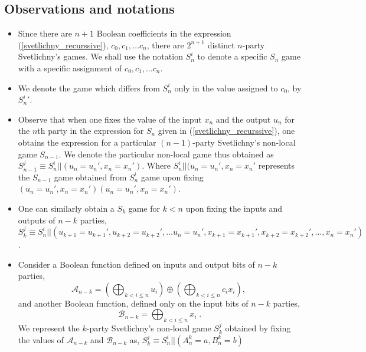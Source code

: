 \documentclass[%
 reprint,
 amsmath,amssymb,
 aps,
]{revtex4-1}
\theoremstyle{plain}
\begin{document}
\subsection{Observations and notations}
\begin{itemize}
\item Since there are ${n+1}$ Boolean coefficients in the expression (\ref{svetlichny_recurssive}), $c_0,c_1,\ldots c_n$, there are $2^{n+1}$ distinct $n$-party Svetlichny's games. We shall use the notation $S_n^i$ to denote a specific $S_n$ game with a specific assignment of $c_0,c_1,\ldots c_n$.
\item We denote the game which differs from $S_n^i$ only in the value assigned to $c_0$, by ${S_n^i}'$.
\item Observe that when one fixes the value of the input $x_n$ and the output $u_n$ for the $n$th party in the expression for $S_n$ given in (\ref{svetlichny_recurssive}), one obtains the expression for a particular $(n-1)$-party Svetlichny's non-local game $S_{n-1}$. We denote the particular non-local game thus obtained as $S_{n-1}^j\equiv S_n^i||(u_n=u_n',x_n=x_n')$. Where $S_n^i||(u_n=u_n',x_n=x_n'$ represents the $S_{n-1}$ game obtained from $S_n^i$ game upon fixing $(u_n=u_n',x_n=x_n')(u_n=u_n',x_n=x_n')$.
\item One can similarly obtain a $S_{k}$ game for $k<n$ upon fixing the inputs and outputs of $n-k$ parties, $S_k^j\equiv S_n^i||(u_{k+1}=u_{k+1}',u_{k+2}=u_{k+2}',\ldots u_n=u_n',x_{k+1}=x_{k+1}',x_{k+2}=x_{k+2}',\ldots,x_n=x_n')$.
\item Consider a Boolean function defined on inputs and output bits of $n-k$ parties,
\begin{equation} \label{aux1}
\mathcal{A}_{n-k}=(\bigoplus_{k<i\le n} u_i)\oplus (\bigoplus_{k<i\le n}c_ix_i), \; 
\end{equation}
and another Boolean function, defined only on the input bits of $n-k$ parties,
\begin{equation}\label{aux2}
\mathcal{B}_{n-k}=\bigoplus_{k<i \le n}x_i \; .
\end{equation}
We represent the $k$-party Svetlichny's non-local game $S_k^j$ obtained by fixing the values of $\mathcal{A}_{n-k}$ and $\mathcal{B}_{n-k}$ as, $S_k^j\equiv S_n^i||(A_n^k=a,B_n^k=b)$   
\end{itemize}
\end{document}
